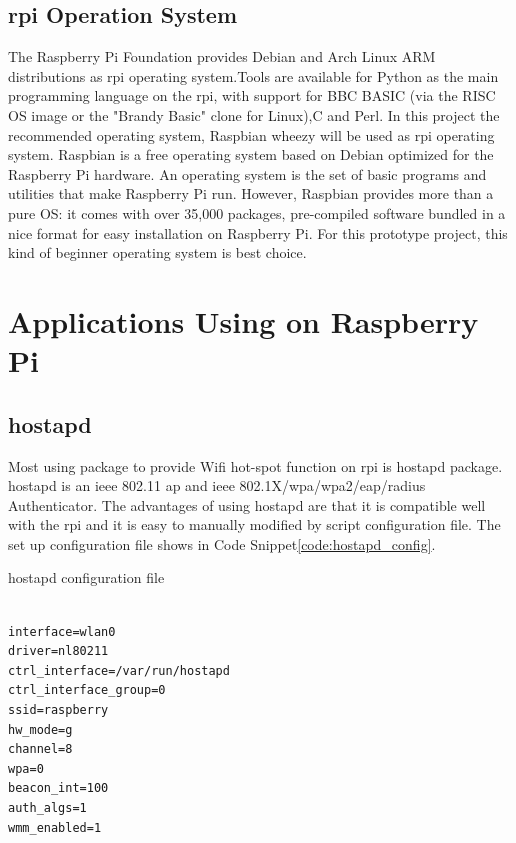 \subsection{\gls{rpi} Operation System}
\par The Raspberry Pi Foundation provides Debian and Arch Linux ARM distributions as \gls{rpi} operating system.Tools are available for Python as the main programming language on the \gls{rpi}, with support for BBC BASIC (via the RISC OS image or the "Brandy Basic" clone for Linux),C and Perl. In this project the recommended operating system, Raspbian wheezy\cite{raspbian} will be used as \gls{rpi} operating system. Raspbian is a free operating system based on Debian optimized for the Raspberry Pi hardware. An operating system is the set of basic programs and utilities that make Raspberry Pi run. However, Raspbian provides more than a pure OS: it comes with over 35,000 packages, pre-compiled software bundled in a nice format for easy installation on Raspberry Pi. For this prototype project, this kind of beginner operating system is best choice.

\section{Applications Using on Raspberry Pi}

\subsection{hostapd}
\par Most using package to provide Wifi hot-spot function on \gls{rpi} is hostapd\cite{hostapd} package. hostapd is an \gls{ieee} 802.11 \gls{ap} and \gls{ieee} 802.1X/\gls{wpa}/\gls{wpa2}/\gls{eap}/\gls{radius} Authenticator. The  advantages of using hostapd are that it is compatible well with the \gls{rpi} and it is easy to manually modified by script configuration file. The set up configuration file shows in Code Snippet\ref{code:hostapd_config}.

\begin{algorithm}[h]
  \caption{hostapd configuration file}
  \label{code:hostapd_config}
  \begin{verbatim}
  
interface=wlan0
driver=nl80211
ctrl_interface=/var/run/hostapd
ctrl_interface_group=0
ssid=raspberry
hw_mode=g
channel=8
wpa=0
beacon_int=100
auth_algs=1
wmm_enabled=1
 \end{verbatim}
\end{algorithm}

